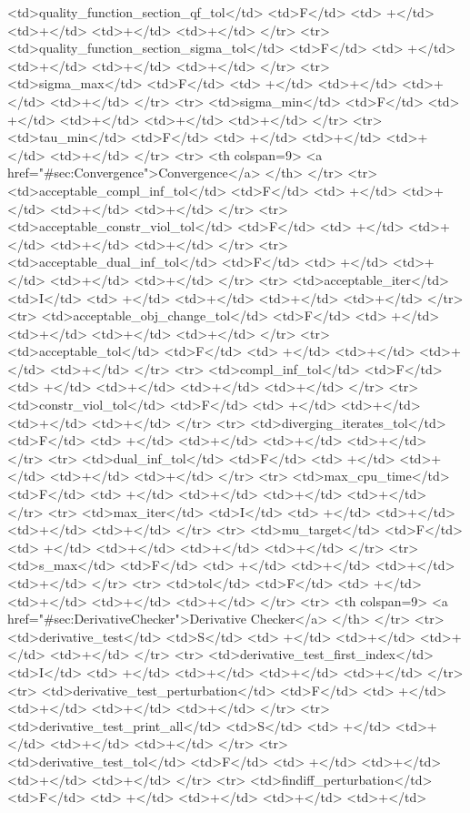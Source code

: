 {{<td>quality_function_section_qf_tol</td>
<td>F</td>
<td> +</td>
<td>+</td>
<td>+</td>
<td>+</td>
</tr>
<tr>
<td>quality_function_section_sigma_tol</td>
<td>F</td>
<td> +</td>
<td>+</td>
<td>+</td>
<td>+</td>
</tr>
<tr>
<td>sigma_max</td>
<td>F</td>
<td> +</td>
<td>+</td>
<td>+</td>
<td>+</td>
</tr>
<tr>
<td>sigma_min</td>
<td>F</td>
<td> +</td>
<td>+</td>
<td>+</td>
<td>+</td>
</tr>
<tr>
<td>tau_min</td>
<td>F</td>
<td> +</td>
<td>+</td>
<td>+</td>
<td>+</td>
</tr>
<tr>   <th colspan=9> <a href="#sec:Convergence">Convergence</a> </th>
</tr>
<tr>
<td>acceptable_compl_inf_tol</td>
<td>F</td>
<td> +</td>
<td>+</td>
<td>+</td>
<td>+</td>
</tr>
<tr>
<td>acceptable_constr_viol_tol</td>
<td>F</td>
<td> +</td>
<td>+</td>
<td>+</td>
<td>+</td>
</tr>
<tr>
<td>acceptable_dual_inf_tol</td>
<td>F</td>
<td> +</td>
<td>+</td>
<td>+</td>
<td>+</td>
</tr>
<tr>
<td>acceptable_iter</td>
<td>I</td>
<td> +</td>
<td>+</td>
<td>+</td>
<td>+</td>
</tr>
<tr>
<td>acceptable_obj_change_tol</td>
<td>F</td>
<td> +</td>
<td>+</td>
<td>+</td>
<td>+</td>
</tr>
<tr>
<td>acceptable_tol</td>
<td>F</td>
<td> +</td>
<td>+</td>
<td>+</td>
<td>+</td>
</tr>
<tr>
<td>compl_inf_tol</td>
<td>F</td>
<td> +</td>
<td>+</td>
<td>+</td>
<td>+</td>
</tr>
<tr>
<td>constr_viol_tol</td>
<td>F</td>
<td> +</td>
<td>+</td>
<td>+</td>
<td>+</td>
</tr>
<tr>
<td>diverging_iterates_tol</td>
<td>F</td>
<td> +</td>
<td>+</td>
<td>+</td>
<td>+</td>
</tr>
<tr>
<td>dual_inf_tol</td>
<td>F</td>
<td> +</td>
<td>+</td>
<td>+</td>
<td>+</td>
</tr>
<tr>
<td>max_cpu_time</td>
<td>F</td>
<td> +</td>
<td>+</td>
<td>+</td>
<td>+</td>
</tr>
<tr>
<td>max_iter</td>
<td>I</td>
<td> +</td>
<td>+</td>
<td>+</td>
<td>+</td>
</tr>
<tr>
<td>mu_target</td>
<td>F</td>
<td> +</td>
<td>+</td>
<td>+</td>
<td>+</td>
</tr>
<tr>
<td>s_max</td>
<td>F</td>
<td> +</td>
<td>+</td>
<td>+</td>
<td>+</td>
</tr>
<tr>
<td>tol</td>
<td>F</td>
<td> +</td>
<td>+</td>
<td>+</td>
<td>+</td>
</tr>
<tr>   <th colspan=9> <a href="#sec:DerivativeChecker">Derivative Checker</a> </th>
</tr>
<tr>
<td>derivative_test</td>
<td>S</td>
<td> +</td>
<td>+</td>
<td>+</td>
<td>+</td>
</tr>
<tr>
<td>derivative_test_first_index</td>
<td>I</td>
<td> +</td>
<td>+</td>
<td>+</td>
<td>+</td>
</tr>
<tr>
<td>derivative_test_perturbation</td>
<td>F</td>
<td> +</td>
<td>+</td>
<td>+</td>
<td>+</td>
</tr>
<tr>
<td>derivative_test_print_all</td>
<td>S</td>
<td> +</td>
<td>+</td>
<td>+</td>
<td>+</td>
</tr>
<tr>
<td>derivative_test_tol</td>
<td>F</td>
<td> +</td>
<td>+</td>
<td>+</td>
<td>+</td>
</tr>
<tr>
<td>findiff_perturbation</td>
<td>F</td>
<td> +</td>
<td>+</td>
<td>+</td>
<td>+</td>
}}
